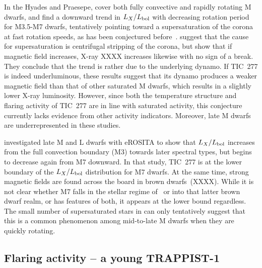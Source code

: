 \documentclass[twocolumn]{aastex631}
\begin{document}
In the Hyades and Praesepe, \citet{nunez2022factory} cover both fully convective and rapidly rotating M dwarfs, and find a downward trend in $L_X/L_{\rm bol}$ with decreasing rotation period for M3.5-M7 dwarfs, tentatively pointing toward a supersaturation of the corona at fast rotation speeds, as has been conjectured before~\citep{jeffries2011investigating,ramsay2020tess}.   \citet{jeffries2011investigating} suggest that the cause for supersaturation is centrifugal stripping of the corona, but \citet{reiners2022magnetism} show that if magnetic field increases, X-ray XXXX increases likewise with no sign of a break. They conclude that the trend is rather due to the underlying dynamo. If TIC~277 is indeed underluminous, these results suggest that its dynamo produces a weaker magnetic field than that of other saturated M dwarfs, which results in a slightly lower X-ray luminosity. However, since both the temperature structure and flaring activity of TIC~277 are in line with saturated activity, this conjecture currently lacks evidence from other activity indicators. Moreover, late M dwarfs are underrepresented in these studies. 

\citet{stelzer2022first} investigated late M and L dwarfs with eROSITA to show that $L_X/L_{\rm bol}$ increases from the full convection boundary (M3) towards later spectral types, but begins to decrease again from M7 downward. In that study, TIC~277 is at the lower boundary of the $L_X/L_{\rm bol}$ distribution for M7 dwarfs. At the same time, strong magnetic fields are found across the board in brown dwarfs~(XXXX). While it is not clear whether M7 falls in the stellar regime of~\citet{reiners2022magnetism} or into that latter brown dwarf realm, or has features of both, it appears at the lower bound regardless. The small number of supersaturated stars in \citet{nunez2022factory}  can only tentatively suggest that this is a common phenomenon among mid-to-late M dwarfs when they are quickly rotating.  



\subsection{Flaring activity -- a young TRAPPIST-1}
\label{sec:discussion:flares}
\end{document}
